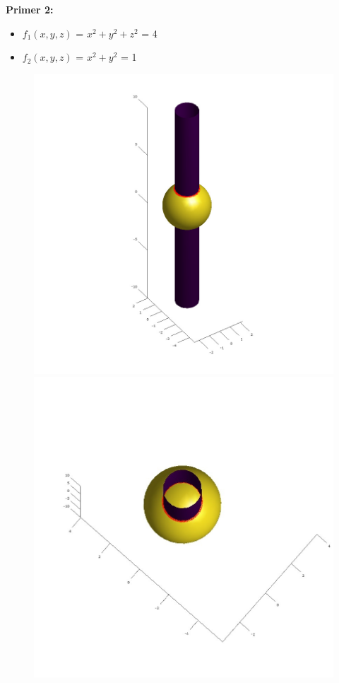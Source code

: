 \documentclass[12pt]{article}
\begin{document}
	\begin{minipage}{\textwidth}
	\textbf{\large{Primer 2:}}
	\begin{itemize}  
		\item $f_{1}(x,y,z)$ = $x^2 + y^2 + z^2$ = 4
		\item $f_{2}(x,y,z)$ = $x^2 + y^2$ = 1
	\end{itemize}
	\begin{figure}[H]
	    \centering
	    \includegraphics[scale=0.3]{primer2_1}
    	\includegraphics[scale=0.3]{primer2_2}
	\end{figure}
	\end{minipage}
	
\end{document}

